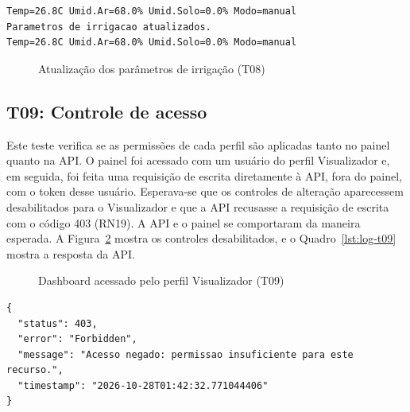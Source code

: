\vspace{0.6\baselineskip}
\noindent\begin{minipage}{\linewidth}
\begin{lstlisting}[language={}, caption={Log do monitor serial na atualização dos parâmetros (T08)}, label={lst:log-t08}]
Temp=26.8C Umid.Ar=68.0% Umid.Solo=0.0% Modo=manual
Parametros de irrigacao atualizados.
Temp=26.8C Umid.Ar=68.0% Umid.Solo=0.0% Modo=manual
\end{lstlisting}
\vspace{-0.5\baselineskip}
\end{minipage}
\medskip

\begin{figure}[htbp]
  \centering
  \caption{Atualização dos parâmetros de irrigação (T08)}
  \label{fig:t08-config}
\end{figure}

\subsection{T09: Controle de acesso}

Este teste verifica se as permissões de cada perfil são aplicadas tanto no painel quanto na API. O painel foi acessado com um usuário do perfil Visualizador e, em seguida, foi feita uma requisição de escrita diretamente à API, fora do painel, com o token desse usuário. Esperava-se que os controles de alteração aparecessem desabilitados para o Visualizador e que a API recusasse a requisição de escrita com o código 403 (RN19). A API e o painel se comportaram da maneira esperada. A Figura~\ref{fig:t09-visualizador} mostra os controles desabilitados, e o Quadro~\ref{lst:log-t09} mostra a resposta da API.

\begin{figure}[htbp]
  \centering
  \caption{Dashboard acessado pelo perfil Visualizador (T09)}
  \label{fig:t09-visualizador}
\end{figure}

\vspace{0.6\baselineskip}
\noindent\begin{minipage}{\linewidth}
\begin{lstlisting}[language={}, caption={Resposta da API a uma requisição sem permissão (T09)}, label={lst:log-t09}]
{
  "status": 403,
  "error": "Forbidden",
  "message": "Acesso negado: permissao insuficiente para este recurso.",
  "timestamp": "2026-10-28T01:42:32.771044406"
}
\end{lstlisting}
\vspace{-0.5\baselineskip}
\end{minipage}
\medskip

